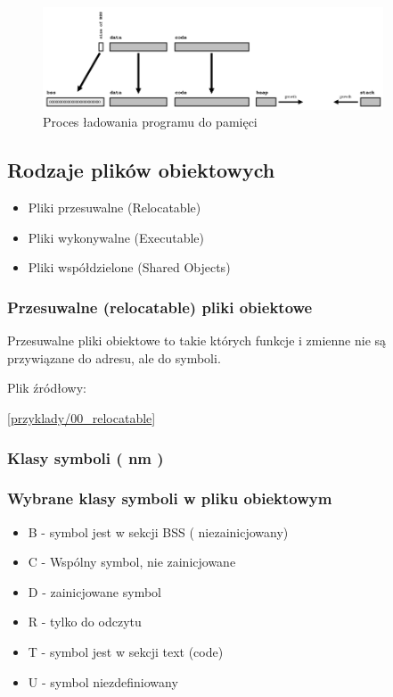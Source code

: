 \begin{frame}[t]
  \begin{figure}
    \includegraphics[width=0.9\textwidth]{loading.png}
    \caption{Proces ładowania programu do pamięci\cite{lurklurk}}
  \end{figure}

\end{frame}

\subsection{Rodzaje plików obiektowych}
\begin{frame}
  \begin{itemize}
  \item Pliki przesuwalne (Relocatable)
  \item Pliki wykonywalne (Executable)
  \item Pliki współdzielone (Shared Objects)
  \end{itemize}
\end{frame}
\begin{frame}[t]\frametitle{Przesuwalne (relocatable) pliki obiektowe}
  \begin{alertblock}{}
    Przesuwalne pliki obiektowe to takie których funkcje i zmienne nie są
    przywiązane do adresu, ale do symboli. \cite{Carson}
  \end{alertblock}


  Plik źródłowy:
  
  

  [\url{przyklady/00_relocatable}]

\end{frame}

\subsubsection{Klasy symboli ( nm )}

\begin{frame}[t]\frametitle{Wybrane klasy symboli w pliku obiektowym \cite{nmMan} }
  \begin{itemize}
  \item B - symbol jest w sekcji BSS ( niezainicjowany)
  \item C - Wspólny symbol, nie zainicjowane
  \item D - zainicjowane symbol
  \item R - tylko do odczytu
  \item T - symbol jest w sekcji text (code)
  \item U - symbol niezdefiniowany
  \end{itemize}
  
\end{frame}

